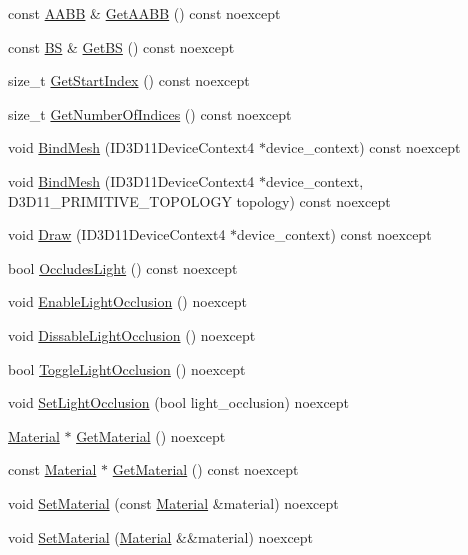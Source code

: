 \begin{DoxyCompactItemize}
const \hyperlink{structmage_1_1_a_a_b_b}{A\+A\+BB} \& \hyperlink{classmage_1_1_model_a07af22d1e72ffde3ad33b709a8d5c7f4}{Get\+A\+A\+BB} () const noexcept
\item 
const \hyperlink{structmage_1_1_b_s}{BS} \& \hyperlink{classmage_1_1_model_a7d99f18fd9cd6902795f77995b87bea2}{Get\+BS} () const noexcept
\item 
size\+\_\+t \hyperlink{classmage_1_1_model_a876fcfe369f12e2d7edb6b533dd06252}{Get\+Start\+Index} () const noexcept
\item 
size\+\_\+t \hyperlink{classmage_1_1_model_a37c9814a445159fd742bcc1b9a5a7b94}{Get\+Number\+Of\+Indices} () const noexcept
\item 
void \hyperlink{classmage_1_1_model_a0ee2a2b1bed4600f052af46ffcf12884}{Bind\+Mesh} (I\+D3\+D11\+Device\+Context4 $\ast$device\+\_\+context) const noexcept
\item 
void \hyperlink{classmage_1_1_model_a3eb8cec219dd224e302f832690324e14}{Bind\+Mesh} (I\+D3\+D11\+Device\+Context4 $\ast$device\+\_\+context, D3\+D11\+\_\+\+P\+R\+I\+M\+I\+T\+I\+V\+E\+\_\+\+T\+O\+P\+O\+L\+O\+GY topology) const noexcept
\item 
void \hyperlink{classmage_1_1_model_aa0358375a2906b24ce4f3e0ddc4cdd01}{Draw} (I\+D3\+D11\+Device\+Context4 $\ast$device\+\_\+context) const noexcept
\item 
bool \hyperlink{classmage_1_1_model_a2ab5542819b80d58f349128a6c0194b5}{Occludes\+Light} () const noexcept
\item 
void \hyperlink{classmage_1_1_model_a5fd5e62a3365810d84af4cf9c202a9fa}{Enable\+Light\+Occlusion} () noexcept
\item 
void \hyperlink{classmage_1_1_model_a7e21b77f1f0afa83fef7a0398d6a9411}{Dissable\+Light\+Occlusion} () noexcept
\item 
bool \hyperlink{classmage_1_1_model_a68168e66cb04c08f27616e9d7768a99e}{Toggle\+Light\+Occlusion} () noexcept
\item 
void \hyperlink{classmage_1_1_model_aabcd12eeab9d6b81e27c727cb94cf57a}{Set\+Light\+Occlusion} (bool light\+\_\+occlusion) noexcept
\item 
\hyperlink{classmage_1_1_material}{Material} $\ast$ \hyperlink{classmage_1_1_model_a46728db5ca9052c62e9403ec7d6a6c21}{Get\+Material} () noexcept
\item 
const \hyperlink{classmage_1_1_material}{Material} $\ast$ \hyperlink{classmage_1_1_model_a10a9de6608365356b5b6ad2669ab39f8}{Get\+Material} () const noexcept
\item 
void \hyperlink{classmage_1_1_model_a684886e1f43cdc6ebd5c52f9437f9869}{Set\+Material} (const \hyperlink{classmage_1_1_material}{Material} \&material) noexcept
\item 
void \hyperlink{classmage_1_1_model_a19f6c35097f95d8d41497cc596e18bc5}{Set\+Material} (\hyperlink{classmage_1_1_material}{Material} \&\&material) noexcept
\end{DoxyCompactItemize}
